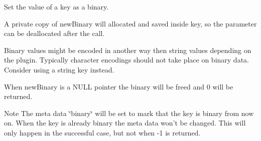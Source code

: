Set the value of a key as a binary.

A private copy of {\ttfamily new\-Binary} will allocated and saved inside {\ttfamily key}, so the parameter can be deallocated after the call.

Binary values might be encoded in another way then string values depending on the plugin. Typically character encodings should not take place on binary data. Consider using a string key instead.

When new\-Binary is a N\-U\-L\-L pointer the binary will be freed and 0 will be returned.

\begin{DoxyNote}{Note}
The meta data \char`\"{}binary\char`\"{} will be set to mark that the key is binary from now on. When the key is already binary the meta data won't be changed. This will only happen in the successful case, but not when -\/1 is returned.
\end{DoxyNote}

